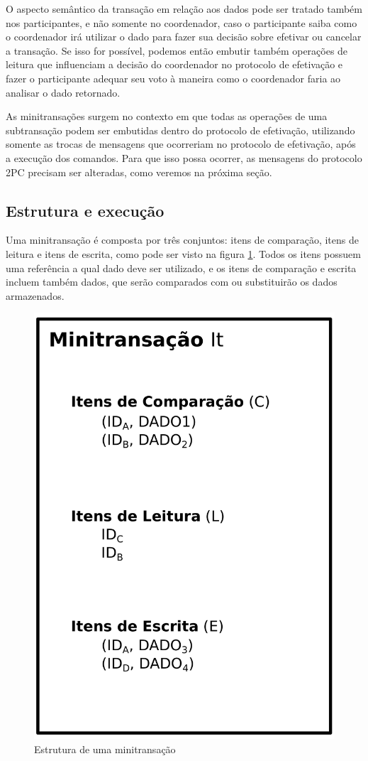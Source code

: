 \documentclass[11pt,twoside,a4paper]{book}
\begin{document}
O aspecto semântico da transação em relação aos dados pode ser tratado também nos participantes, e não somente no coordenador, caso o participante saiba como o coordenador irá utilizar o dado para fazer sua decisão sobre efetivar ou cancelar a transação. Se isso for possível, podemos então embutir também operações de leitura que influenciam a decisão do coordenador no protocolo de efetivação e fazer o participante adequar seu voto à maneira como o coordenador faria ao analisar o dado retornado.

As minitransações surgem no contexto em que todas as operações de uma subtransação podem ser embutidas dentro do protocolo de efetivação, utilizando somente as trocas de mensagens que ocorreriam no protocolo de efetivação, após a execução dos comandos. Para que isso possa ocorrer, as mensagens do protocolo 2PC precisam ser alteradas, como veremos na próxima seção.

\subsection{Estrutura e execução}
\label{subsec:estrutura-minitransacoes}
Uma minitransação é composta por três conjuntos: itens de comparação, itens de leitura e itens de escrita, como pode ser visto na figura \ref{fig:estrutura_minitransacao}. Todos os itens possuem uma referência a qual dado deve ser utilizado, e os itens de comparação e escrita incluem também dados, que serão comparados com ou substituirão os dados armazenados. 

\begin{figure}
  \centering
  \includegraphics[width=.40\textwidth]{estrutura_minitransacao} 
  \caption{Estrutura de uma minitransação}
  \label{fig:estrutura_minitransacao} 
\end{figure}
\end{document}
